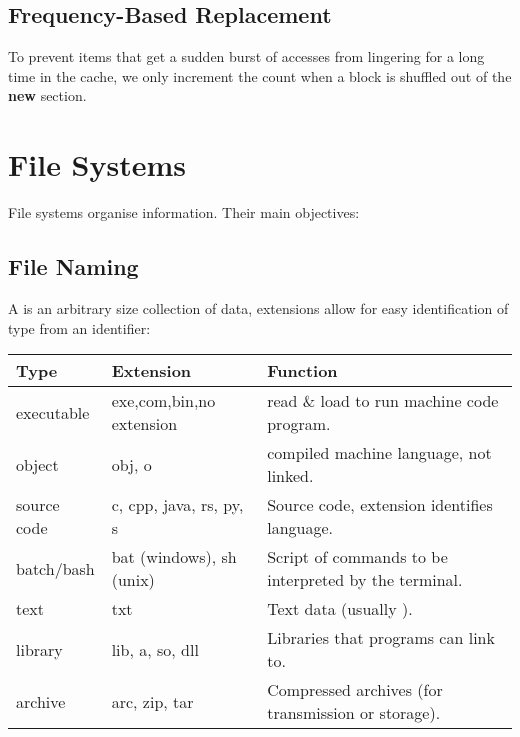 \documentclass{report}
\begin{document}
\subsection*{Frequency-Based Replacement}
To prevent items that get a sudden burst of accesses from lingering
for a long time in the cache, we only increment the count when a
block is shuffled out of the \textbf{new} section.

\section*{File Systems}
File systems organise information. Their main objectives:

\subsection*{File Naming}
A  is an arbitrary size collection of data, extensions allow for easy identification of type from an identifier:
\begin{center}
	\begin{tabular}{l l l}
		\textbf{Type} & \textbf{Extension}       & \textbf{Function}                                     \\
		\hline
		executable    & exe,com,bin,no extension & read \& load to run machine code program.             \\
		object        & obj, o                   & compiled machine language, not linked.                \\
		source code   & c, cpp, java, rs, py, s  & Source code, extension identifies language.           \\
		batch/bash    & bat (windows), sh (unix) & Script of commands to be interpreted by the terminal. \\
		text          & txt                      & Text data (usually \keyword{ascii}).                  \\
		library       & lib, a, so, dll          & Libraries that programs can link to.                  \\
		archive       & arc, zip, tar            & Compressed archives (for transmission or storage).    \\
	\end{tabular}
\end{center}
\end{document}
